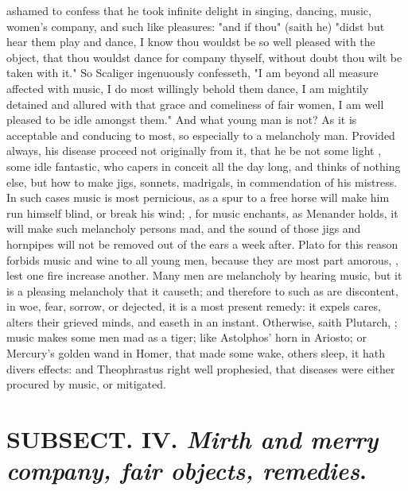 {ashamed to confess that he took infinite delight in singing, dancing, music, women's company, and such like pleasures: "and if thou" (saith he) "didst but hear them play and dance, I know thou wouldst be so well pleased with the object, that thou wouldst dance for company thyself, without doubt thou wilt be taken with it." So Scaliger ingenuously confesseth,  "I am beyond all measure affected with music, I do most willingly behold them dance, I am mightily detained and allured with that grace and comeliness of fair women, I am well pleased to be idle amongst them." And what young man is not? As it is acceptable and conducing to most, so especially to a melancholy man. Provided always, his disease proceed not originally from it, that he be not some light , some idle fantastic, who capers in conceit all the day long, and thinks of nothing else, but how to make jigs, sonnets, madrigals, in commendation of his mistress. In such cases music is most pernicious, as a spur to a free horse will make him run himself blind, or break his wind; , for music enchants, as Menander holds, it will make such melancholy persons mad, and the sound of those jigs and hornpipes will not be removed out of the ears a week after. Plato for this reason forbids music and wine to all young men, because they are most part amorous, , lest one fire increase another. Many men are melancholy by hearing music, but it is a pleasing melancholy that it causeth; and therefore to such as are discontent, in woe, fear, sorrow, or dejected, it is a most present remedy: it expels cares, alters their grieved minds, and easeth in an instant. Otherwise, saith Plutarch, ; music makes some men mad as a tiger; like Astolphos' horn in Ariosto; or Mercury's golden wand in Homer, that made some wake, others sleep, it hath divers effects: and Theophrastus right well prophesied, that diseases were either procured by music, or mitigated.

\section{ SUBSECT. IV. \emph{Mirth and merry company, fair objects, remedies}.}


}
